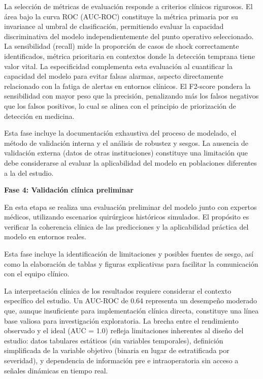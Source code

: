 La selección de métricas de evaluación responde a criterios clínicos rigurosos. El área bajo la curva ROC (AUC-ROC) constituye la métrica primaria por su invariance al umbral de clasificación, permitiendo evaluar la capacidad discriminativa del modelo independientemente del punto operativo seleccionado. La sensibilidad (recall) mide la proporción de casos de shock correctamente identificados, métrica prioritaria en contextos donde la detección temprana tiene valor vital. La especificidad complementa esta evaluación al cuantificar la capacidad del modelo para evitar falsas alarmas, aspecto directamente relacionado con la fatiga de alertas en entornos clínicos. El F2-score pondera la sensibilidad con mayor peso que la precisión, penalizando más los falsos negativos que los falsos positivos, lo cual se alinea con el principio de priorización de detección en medicina.

Esta fase incluye la documentación exhaustiva del proceso de modelado, el método de validación interna y el análisis de robustez y sesgos. La ausencia de validación externa (datos de otras instituciones) constituye una limitación que debe considerarse al evaluar la aplicabilidad del modelo en poblaciones diferentes a la del estudio.

\textbf{Fase 4: Validación clínica preliminar}

En esta etapa se realiza una evaluación preliminar del modelo junto con expertos médicos, utilizando escenarios quirúrgicos históricos simulados. El propósito es verificar la coherencia clínica de las predicciones y la aplicabilidad práctica del modelo en entornos reales.

Esta fase incluye la identificación de limitaciones y posibles fuentes de sesgo, así como la elaboración de tablas y figuras explicativas para facilitar la comunicación con el equipo clínico.

La interpretación clínica de los resultados requiere considerar el contexto específico del estudio. Un AUC-ROC de 0.64 representa un desempeño moderado que, aunque insuficiente para implementación clínica directa, constituye una línea base valiosa para investigación exploratoria. La brecha entre el rendimiento observado y el ideal (AUC = 1.0) refleja limitaciones inherentes al diseño del estudio: datos tabulares estáticos (sin variables temporales), definición simplificada de la variable objetivo (binaria en lugar de estratificada por severidad), y dependencia de información pre e intraoperatoria sin acceso a señales dinámicas en tiempo real.


